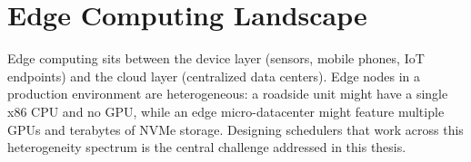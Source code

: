 \section{Edge Computing Landscape}

Edge computing sits between the device layer (sensors, mobile phones, IoT endpoints) and the cloud layer (centralized data centers). Edge nodes in a production environment are heterogeneous: a roadside unit might have a single x86 CPU and no GPU, while an edge micro-datacenter might feature multiple GPUs and terabytes of NVMe storage. Designing schedulers that work across this heterogeneity spectrum is the central challenge addressed in this thesis.
